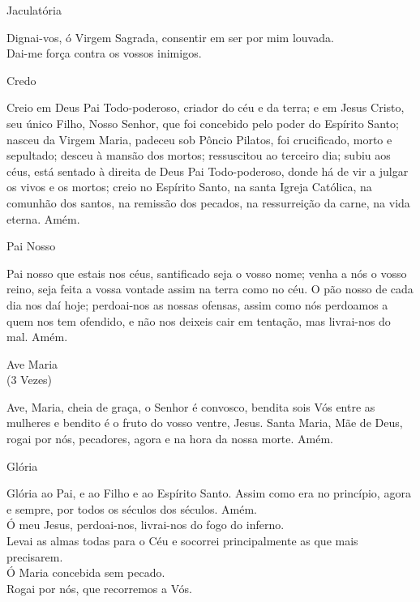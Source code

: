 \begin{center}
    Jaculatória
\end{center}
\begin{flushleft}
    \VbarRed{} Dignai-vos, ó Virgem Sagrada, consentir em ser por mim louvada. \\
    \RbarRed{} Dai-me força contra os vossos inimigos.
\end{flushleft}
\begin{center}
    Credo
\end{center}
\begin{flushleft}
    Creio em Deus Pai Todo-poderoso, criador do céu e da terra; e em Jesus Cristo, seu único Filho, Nosso Senhor, que foi concebido pelo poder do Espírito Santo; nasceu da Virgem Maria, padeceu sob Pôncio Pilatos, foi crucificado, morto e sepultado; desceu à mansão dos mortos; ressuscitou ao terceiro dia; subiu aos céus, está sentado à direita de Deus Pai Todo-poderoso, donde há de vir a julgar os vivos e os mortos; creio no Espírito Santo, na santa Igreja Católica, na comunhão dos santos, na remissão dos pecados, na ressurreição da carne, na vida eterna. Amém.
\end{flushleft}
\begin{center}
    Pai Nosso
\end{center}
\begin{flushleft}
    Pai nosso que estais nos céus, santificado seja o vosso nome; venha a nós o vosso reino, seja feita a vossa vontade assim na terra como no céu. O pão nosso de cada dia nos daí hoje; perdoai-nos as nossas ofensas, assim como nós perdoamos a quem nos tem ofendido, e não nos deixeis cair em tentação, mas livrai-nos do mal. Amém.
\end{flushleft}
\begin{center}
    Ave Maria \\ \textcolor{VioletRed2}{\scriptsize{(3 Vezes)}}
\end{center}
\begin{flushleft}
    Ave, Maria, cheia de graça, o Senhor é convosco, bendita sois Vós entre as mulheres e bendito é o fruto do vosso ventre, Jesus. Santa Maria, Mãe de Deus, rogai por nós, pecadores, agora e na hora da nossa morte. Amém.
\end{flushleft}
\begin{center}
    Glória
\end{center}
\begin{flushleft}
    Glória ao Pai, e ao Filho e ao Espírito Santo. Assim como era no princípio, agora e sempre, por todos os séculos dos séculos. Amém.
    \vspace{.2cm} \\
    \VbarRed{} Ó meu Jesus, perdoai-nos, livrai-nos do fogo do inferno. \\
    \RbarRed{} Levai as almas todas para o Céu e socorrei principalmente as que mais precisarem.
    \vspace{.2cm} \\
    \VbarRed{} Ó Maria concebida sem pecado.\\
    \RbarRed{} Rogai por nós, que recorremos a Vós.
\end{flushleft}
